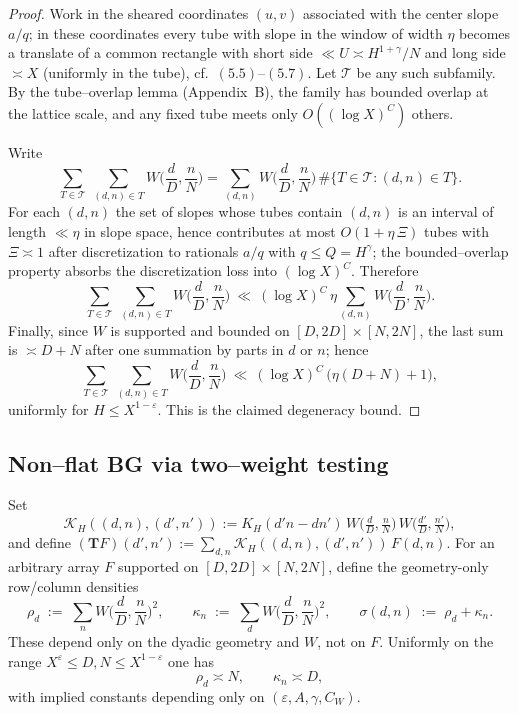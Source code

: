 \begin{proof}
Work in the sheared coordinates $(u,v)$ associated with the center slope $a/q$; in these coordinates every tube with slope in the window of width $\eta$ becomes a translate of a common rectangle with short side $\ll U\asymp H^{1+\gamma}/N$ and long side $\asymp X$ (uniformly in the tube), cf.\ \((5.5)\)–\((5.7)\). Let $\mathcal{T}$ be any such subfamily. By the tube–overlap lemma (Appendix~B), the family has bounded overlap at the lattice scale, and any fixed tube meets only $O((\log X)^C)$ others.

Write
\[
\sum_{T\in\mathcal{T}} \ \sum_{(d,n)\in T} W\!\Big(\frac{d}{D},\frac{n}{N}\Big)
=\sum_{(d,n)} W\!\Big(\frac{d}{D},\frac{n}{N}\Big)\,\#\{T\in\mathcal{T}:(d,n)\in T\}.
\]
For each $(d,n)$ the set of slopes whose tubes contain $(d,n)$ is an interval of length $\ll \eta$ in slope space, hence contributes at most $O(1+ \eta\,\Xi)$ tubes with $\Xi\asymp 1$ after discretization to rationals $a/q$ with $q\le Q=H^\gamma$; the bounded–overlap property absorbs the discretization loss into $(\log X)^C$. Therefore
\[
\sum_{T\in\mathcal{T}} \ \sum_{(d,n)\in T} W\!\Big(\frac{d}{D},\frac{n}{N}\Big)
\ \ll\ (\log X)^C\,\eta\sum_{(d,n)} W\!\Big(\frac{d}{D},\frac{n}{N}\Big).
\]
Finally, since $W$ is supported and bounded on $[D,2D]\times[N,2N]$, the last sum is $\asymp D+N$ after one summation by parts in $d$ or $n$; hence
\[
\sum_{T\in\mathcal{T}} \ \sum_{(d,n)\in T} W\!\Big(\frac{d}{D},\frac{n}{N}\Big)\ \ll\ (\log X)^C\,\big(\eta(D+N)+1\big),
\]
uniformly for $H\le X^{1-\varepsilon}$. This is the claimed degeneracy bound.
\end{proof}


\subsection{Non–flat BG via two–weight testing}\label{subsec:BG.two-weight}

Set
\[
\mathcal K_H((d,n),(d',n')):=K_H(d'n-dn')\,W\!\Big(\tfrac dD,\tfrac nN\Big)\,W\!\Big(\tfrac{d'}D,\tfrac{n'}N\Big),
\]
and define $(\mathbf T F)(d',n'):=\sum_{d,n}\mathcal K_H((d,n),(d',n'))\,F(d,n)$.
For an arbitrary array $F$ supported on $[D,2D]\times[N,2N]$, define the geometry-only row/column densities
\[
  \rho_d \;:=\; \sum_{n} W\!\Big(\frac{d}{D},\frac{n}{N}\Big)^{\!2},\qquad
  \kappa_n \;:=\; \sum_{d} W\!\Big(\frac{d}{D},\frac{n}{N}\Big)^{\!2},\qquad
  \sigma(d,n) \;:=\; \rho_d+\kappa_n.
\]
These depend only on the dyadic geometry and $W$, not on $F$.  Uniformly on the range $X^\varepsilon\le D,N\le X^{1-\varepsilon}$ one has
\[
  \rho_d \asymp N,\qquad \kappa_n \asymp D,
\]
with implied constants depending only on $(\varepsilon,A,\gamma,C_W)$.

